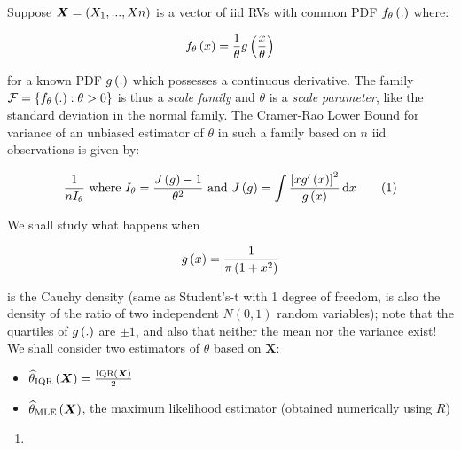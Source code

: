\documentclass[12pt, a4paper]{article}\usepackage[]{graphicx}\usepackage[]{color}
\newcommand{\bs}[1]{\boldsymbol{#1}}
\newcommand{\wh}[1]{\widehat{#1}}
\newcommand{\cur}[1]{\mathcal{#1}}
\begin{document}


\pagestyle{default}
\thispagestyle{empty}

\newpage
\setcounter{page}{1}

Suppose $\bs{X} = \brac{X_1 ,... , X n}$  is a vector of iid RVs with common PDF $f_\theta\left(.\right)$ where:

$$f_\theta\left(x\right) = \frac{1}{\theta}g\left(\frac{x}{\theta}\right)$$

for a known PDF $g\left(.\right)$ which possesses a continuous derivative. The family $\cur{F} = \cbrac{f_\theta\brac{.} : \theta > 0}$ is thus a \textit{scale family} and $\theta$ is a \textit{scale parameter}, like the standard deviation in the normal family. The Cramer-Rao Lower Bound for variance of an unbiased estimator of $\theta$ in such a family based on $n$ iid observations is
given by:

\begin{align*}
\frac{1}{n I_\theta} \text{ where } I_\theta  = \frac{J\left(g\right) - 1}{\theta^2} \text{ and } J\left(g\right) = \int \frac{\left[xg'\left(x\right)\right]^2}{g\left(x\right)}\, \text{d}x \label{1}\tag{1}
\end{align*}

We shall study what happens when 

$$ g\left(x\right) = \frac{1}{\pi\left(1 + x^2\right)}$$

is the Cauchy density (same as Student’s-t with 1 degree of freedom, is also the density of the ratio of two independent $N(0, 1)$ random variables); note that the quartiles of $g\left(.\right)$ are $\pm 1$, and also that neither the mean nor the variance exist! We shall consider two estimators of $\theta$ based on $\bs{X}$:

\begin{itemize}
  \item $\wh{\theta}_{\text{IQR}}\brac{\bs{X}} = \frac{\text{IQR}\brac{\bs{X}}}{2}$
  \item $\wh{\theta}_{\text{MLE}}\brac{\bs{X}}$, the maximum likelihood estimator (obtained numerically using $R$)
\end{itemize}

\begin{enumerate}[label={\bfseries \arabic*.}]
  \item 
\end{enumerate}
\end{document}
